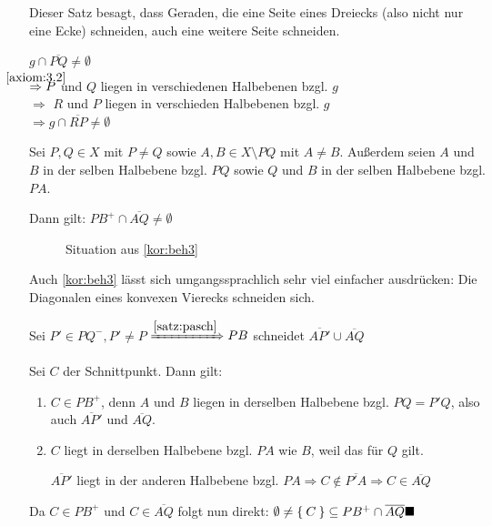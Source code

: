 Dieser Satz besagt, dass Geraden, die eine Seite eines Dreiecks
(also nicht nur eine Ecke) schneiden, auch eine weitere Seite
schneiden.

\begin{beweis}
    $g \cap \overline{PQ} \neq \emptyset$\\
    $\overset{\mathclap{\ref{axiom:3.2}}}{\Rightarrow} P$ und $Q$ liegen in verschiedenen Halbebenen bzgl. $g$\\
    $\Rightarrow$ \obda $R$ und $P$ liegen in verschieden
    Halbebenen bzgl. $g$\\
    $\Rightarrow g \cap \overline{RP} \neq \emptyset$
\end{beweis}

\begin{bemerkung}\label{kor:beh3}
    Sei $P, Q \in X$ mit $P \neq Q$ sowie $A, B \in X \setminus PQ$
    mit $A \neq B$.
    Außerdem seien $A$ und $B$ in der selben Halbebene bzgl. $PQ$ sowie
    $Q$ und $B$ in der selben Halbebene bzgl. $PA$.

    Dann gilt: $PB^+ \cap \overline{AQ} \neq \emptyset$
\end{bemerkung}

\begin{figure}[htp]
    \centering
    
    \caption{Situation aus \cref{kor:beh3}}
    \label{fig:geometry-5}
\end{figure}

Auch \cref{kor:beh3} lässt sich umgangssprachlich sehr viel
einfacher ausdrücken: Die Diagonalen eines konvexen Vierecks
schneiden sich.

\begin{beweis}%
    Sei $P' \in PQ^-, P' \neq P$
    $\xRightarrow{\cref{satz:pasch}} PB$ schneidet
    $\overline{AP'} \cup \overline{AQ}$

    Sei $C$ der Schnittpunkt. Dann gilt:
    \begin{enumerate}[label=(\roman*)]
        \item $C \in PB^+$, denn $A$ und $B$ liegen in derselben
              Halbebene bzgl. $PQ = P'Q$, also auch
              $\overline{AP'}$ und $\overline{AQ}$.
        \item $C$ liegt in derselben Halbebene bzgl. $PA$ wie
              $B$, weil das für $Q$ gilt.

              $\overline{AP'}$ liegt in der anderen Halbebene
              bzgl. $PA \Rightarrow C \notin \overline{P'A} \Rightarrow C \in \overline{AQ}$
    \end{enumerate}
    Da $C \in PB^+$ und $C \in \overline{AQ}$ folgt nun direkt:
    $\emptyset \neq \Set{C} \subseteq PB^+ \cap \overline{AQ} \qed$
\end{beweis}

